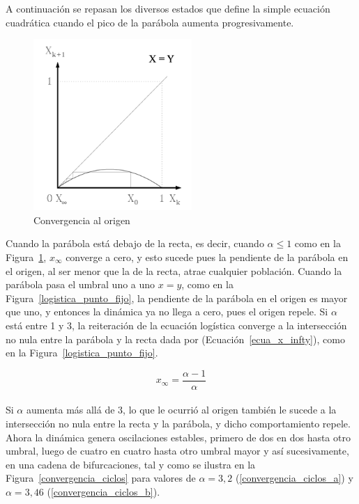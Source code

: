 \documentclass[letterpaper, 11pt, oneside]{article}
\theoremstyle{definition}
\theoremstyle{remark}
\begin{document}
\begin{itemize}
A continuación se repasan los diversos estados que define la simple ecuación cuadrática cuando el pico de la parábola aumenta progresivamente.

\begin{figure}[ht]
	\begin{center}
	\includegraphics[width=6cm]{Imagenes/logistica_converge_cero.png}
	\end{center}
	\caption{Convergencia al origen}
	\label{logistica_converge_cero}
\end{figure}
\newpage

Cuando la parábola está debajo de la recta, es decir, cuando $\alpha \leq 1$ como en la Figura~\ref{logistica_converge_cero}, $x_{\infty}$ converge a cero, y esto sucede pues la pendiente de la parábola en el origen, al ser menor que la de la recta, atrae cualquier población. Cuando la parábola pasa el umbral uno a uno $x = y$, como en la Figura~\ref{logistica_punto_fijo}, la pendiente de la parábola en el origen es mayor que uno, y entonces la dinámica ya no llega a cero, pues el origen repele. Si $\alpha$ está entre 1 y 3, la reiteración de la ecuación logística converge a la intersección no nula entre la parábola y la recta dada por (Ecuación~\ref{ecua_x_infty}), como en la Figura~\ref{logistica_punto_fijo}.

\begin{equation}
	x_{\infty} = \frac {\alpha - 1} {\alpha}
	\label{ecua_x_infty}
\end{equation} \\

Si $\alpha$ aumenta más allá de $3$, lo que le ocurrió al origen también le sucede a la intersección no nula entre la recta y la parábola, y dicho comportamiento repele. Ahora la dinámica genera oscilaciones estables, primero de dos en dos hasta otro umbral, luego de cuatro en cuatro hasta otro umbral mayor y así sucesivamente, en una cadena de bifurcaciones, tal y como se ilustra en la Figura~\ref{convergencia_ciclos} para valores de $\alpha = 3,2$ (\ref{convergencia_ciclos_a}) y $\alpha = 3,46$ (\ref{convergencia_ciclos_b}).


\end{itemize}
\end{document}
